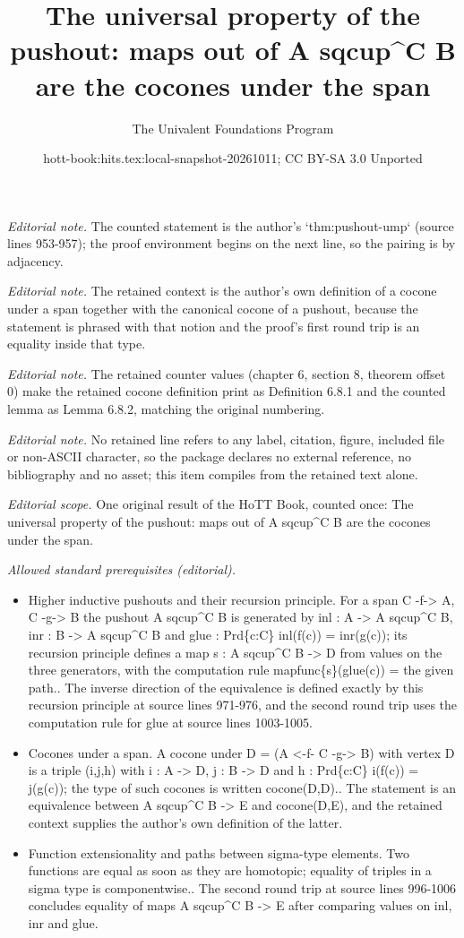 \documentclass[10pt,a4paper]{article}
\title{The universal property of the pushout: maps out of A sqcup\textasciicircum{}C B are the cocones under the span}
\author{The Univalent Foundations Program}
\date{hott-book:hits.tex:local-snapshot-20261011; CC BY-SA 3.0 Unported}
\newcounter{chapter}
\theoremstyle{definition}
\theoremstyle{remark}
\numberwithin{equation}{section}
\begin{document}
\maketitle
\setcounter{chapter}{6}
\setcounter{section}{8}
\setcounter{thm}{0}
\noindent\textit{Editorial note.} The counted statement is the author's `thm:pushout-ump` (source lines 953-957); the proof environment begins on the next line, so the pairing is by adjacency.\par\medskip
\noindent\textit{Editorial note.} The retained context is the author's own definition of a cocone under a span together with the canonical cocone of a pushout, because the statement is phrased with that notion and the proof's first round trip is an equality inside that type.\par\medskip
\noindent\textit{Editorial note.} The retained counter values (chapter 6, section 8, theorem offset 0) make the retained cocone definition print as Definition 6.8.1 and the counted lemma as Lemma 6.8.2, matching the original numbering.\par\medskip
\noindent\textit{Editorial note.} No retained line refers to any label, citation, figure, included file or non-ASCII character, so the package declares no external reference, no bibliography and no asset; this item compiles from the retained text alone.\par\medskip
\noindent\textit{Editorial scope.} One original result of the HoTT Book, counted once: The universal property of the pushout: maps out of A sqcup\textasciicircum{}C B are the cocones under the span.\par\medskip
\noindent\textit{Allowed standard prerequisites (editorial).}\begin{itemize}
\item Higher inductive pushouts and their recursion principle. For a span C -f-> A, C -g-> B the pushout A sqcup\textasciicircum{}C B is generated by inl : A -> A sqcup\textasciicircum{}C B, inr : B -> A sqcup\textasciicircum{}C B and glue : Prd\{c:C\} inl(f(c)) = inr(g(c)); its recursion principle defines a map s : A sqcup\textasciicircum{}C B -> D from values on the three generators, with the computation rule mapfunc\{s\}(glue(c)) = the given path.. The inverse direction of the equivalence is defined exactly by this recursion principle at source lines 971-976, and the second round trip uses the computation rule for glue at source lines 1003-1005.
\item Cocones under a span. A cocone under D = (A <-f- C -g-> B) with vertex D is a triple (i,j,h) with i : A -> D, j : B -> D and h : Prd\{c:C\} i(f(c)) = j(g(c)); the type of such cocones is written cocone(D,D).. The statement is an equivalence between A sqcup\textasciicircum{}C B -> E and cocone(D,E), and the retained context supplies the author's own definition of the latter.
\item Function extensionality and paths between sigma-type elements. Two functions are equal as soon as they are homotopic; equality of triples in a sigma type is componentwise.. The second round trip at source lines 996-1006 concludes equality of maps A sqcup\textasciicircum{}C B -> E after comparing values on inl, inr and glue.
\end{itemize}\medskip
\end{document}
